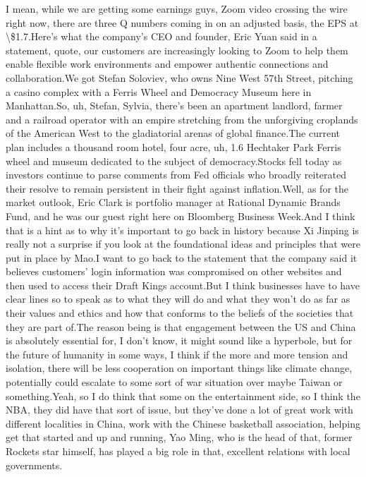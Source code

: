 \documentclass{article}%
\begin{document}
I mean, while we are getting some earnings guys, Zoom video crossing the wire right now, there are three Q numbers coming in on an adjusted basis, the EPS at \textbackslash{}\$1.7.Here's what the company's CEO and founder, Eric Yuan said in a statement, quote, our customers are increasingly looking to Zoom to help them enable flexible work environments and empower authentic connections and collaboration.We got Stefan Soloviev, who owns Nine West 57th Street, pitching a casino complex with a Ferris Wheel and Democracy Museum here in Manhattan.So, uh, Stefan, Sylvia, there's been an apartment landlord, farmer and a railroad operator with an empire stretching from the unforgiving croplands of the American West to the gladiatorial arenas of global finance.The current plan includes a thousand room hotel, four acre, uh, 1.6 Hechtaker Park Ferris wheel and museum dedicated to the subject of democracy.Stocks fell today as investors continue to parse comments from Fed officials who broadly reiterated their resolve to remain persistent in their fight against inflation.Well, as for the market outlook, Eric Clark is portfolio manager at Rational Dynamic Brands Fund, and he was our guest right here on Bloomberg Business Week.And I think that is a hint as to why it's important to go back in history because Xi Jinping is really not a surprise if you look at the foundational ideas and principles that were put in place by Mao.I want to go back to the statement that the company said it believes customers' login information was compromised on other websites and then used to access their Draft Kings account.But I think businesses have to have clear lines so to speak as to what they will do and what they won't do as far as their values and ethics and how that conforms to the beliefs of the societies that they are part of.The reason being is that engagement between the US and China is absolutely essential for, I don't know, it might sound like a hyperbole, but for the future of humanity in some ways, I think if the more and more tension and isolation, there will be less cooperation on important things like climate change, potentially could escalate to some sort of war situation over maybe Taiwan or something.Yeah, so I do think that some on the entertainment side, so I think the NBA, they did have that sort of issue, but they've done a lot of great work with different localities in China, work with the Chinese basketball association, helping get that started and up and running, Yao Ming, who is the head of that, former Rockets star himself, has played a big role in that, excellent relations with local governments.%
\end{document}
